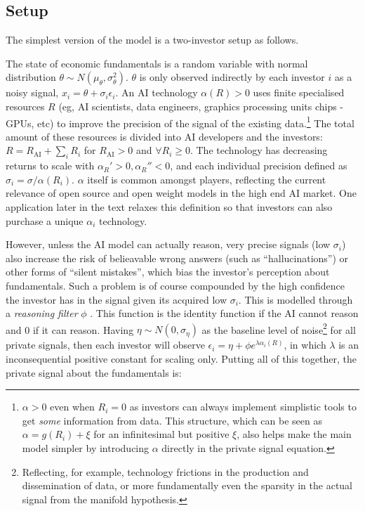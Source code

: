 \documentclass[
]{article}
\theoremstyle{plain}
\theoremstyle{definition}
\theoremstyle{remark}
\begin{document}
\subsection{Setup}\label{setup}

The simplest version of the model is a two-investor setup as follows.

The state of economic fundamentals is a random variable with normal
distribution \(\theta \sim N(\mu_\theta, \sigma_\theta^2)\). \(\theta\)
is only observed indirectly by each investor \(i\) as a noisy signal,
\(x_i = \theta + \sigma_i \epsilon_i\). An AI technology
\(\alpha(R) > 0\) uses finite specialised resources \(R\) (eg, AI
scientists, data engineers, graphics processing units chips - GPUs, etc)
to improve the precision of the signal of the existing data.\footnote{\(\alpha > 0\)
  even when \(R_i = 0\) as investors can always implement simplistic
  tools to get \emph{some} information from data. This structure, which
  can be seen as \(\alpha = g(R_i) + \xi\) for an infinitesimal but
  positive \(\xi\), also helps make the main model simpler by
  introducing \(\alpha\) directly in the private signal equation.} The
total amount of these resources is divided into AI developers and the
investors: \(R = R_{\text{AI}} + \sum_{i} R_i\) for
\(R_{\text{AI}} > 0\) and \(\forall R_i \geq 0\). The technology has
decreasing returns to scale with \(\alpha_R' > 0, \alpha_R'' < 0\), and
each individual precision defined as
\(\sigma_i = \sigma / \alpha(R_i)\). \(\alpha\) itself is common amongst
players, reflecting the current relevance of open source and open weight
models in the high end AI market. One application later in the text
relaxes this definition so that investors can also purchase a unique
\(\alpha_i\) technology.

However, unless the AI model can actually reason, very precise signals
(low \(\sigma_i\)) also increase the risk of belieavable wrong answers
(such as ``hallucinations'') or other forms of ``silent mistakes'',
which bias the investor's perception about fundamentals. Such a problem
is of course compounded by the high confidence the investor has in the
signal given its acquired low \(\sigma_i\). This is modelled through a
\emph{reasoning filter} \(\phi\) . This function is the identity
function if the AI cannot reason and 0 if it can reason. Having
\(\eta \sim N(0, \sigma_\eta)\) as the baseline level of
noise\footnote{Reflecting, for example, technology frictions in the
  production and dissemination of data, or more fundamentally even the
  sparsity in the actual signal from the manifold hypothesis.} for all
private signals, then each investor will observe
\(\epsilon_i = \eta + \phi e^{\lambda \alpha_i(R)}\), in which
\(\lambda\) is an inconsequential positive constant for scaling only.
Putting all of this together, the private signal about the fundamentals
is:
\end{document}
